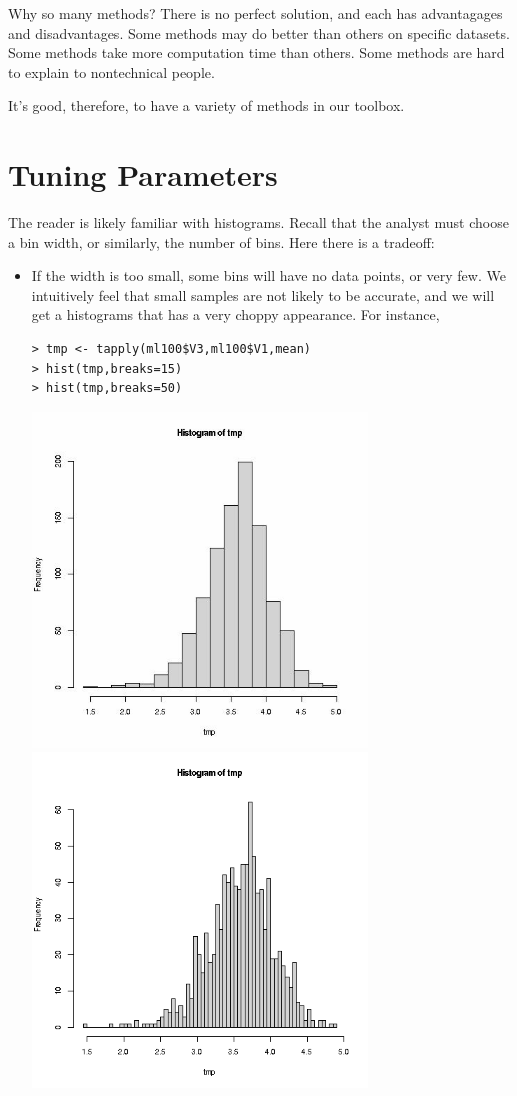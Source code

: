 Why so many methods?  There is no perfect solution, and each has
advantagages and disadvantages. 
Some methods may do better than
others on specific datasets.  Some methods take more computation time
than others.  Some methods are hard to explain to nontechnical people.

It's good, therefore, to have a variety of methods in our toolbox.

\section{Tuning Parameters}

The reader is likely familiar with histograms.  Recall that the analyst
must choose a bin width, or similarly, the number of bins.  Here there
is a tradeoff:

\begin{itemize}

\item If the width is too small, some bins will have no data points, or
very few.  We intuitively feel that small samples are not likely to be
accurate, and we will get a histograms that has a very choppy appearance.
For instance, 

\begin{lstlisting}
> tmp <- tapply(ml100$V3,ml100$V1,mean)
> hist(tmp,breaks=15)
> hist(tmp,breaks=50)
\end{lstlisting}

\includegraphics[width=3.5in]{Images/HistBrks15.png} 
\includegraphics[width=3.5in]{Images/HistBrks50.png} 


\end{itemize}
